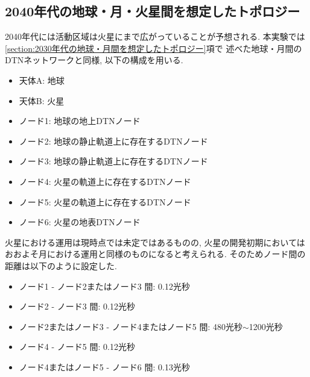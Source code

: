 \subsection{2040年代の地球・月・火星間を想定したトポロジー}
\label{section:2040年代の地球・月・火星間を想定したトポロジー}
2040年代には活動区域は火星にまで広がっていることが予想される. 
本実験では\ref{section:2030年代の地球・月間を想定したトポロジー}項で
述べた地球・月間のDTNネットワークと同様, 以下の構成を用いる. 
\begin{itemize}
    \item 天体A: 地球
    \item 天体B: 火星
    \item ノード1: 地球の地上DTNノード
    \item ノード2: 地球の静止軌道上に存在するDTNノード
    \item ノード3: 地球の静止軌道上に存在するDTNノード
    \item ノード4: 火星の軌道上に存在するDTNノード
    \item ノード5: 火星の軌道上に存在するDTNノード
    \item ノード6: 火星の地表DTNノード
\end{itemize}
火星における運用は現時点では未定ではあるものの, 
火星の開発初期においてはおおよそ月における運用と同様のものになると考えられる. 
そのためノード間の距離は以下のように設定した. 
\begin{itemize}
    \item ノード1 - ノード2またはノード3 間: 0.12光秒
    \item ノード2 - ノード3 間: 0.12光秒
    \item ノード2またはノード3 - ノード4またはノード5  間: 480光秒$\sim$1200光秒
    \item ノード4 - ノード5  間: 0.12光秒
    \item ノード4またはノード5 - ノード6  間: 0.13光秒
\end{itemize}

